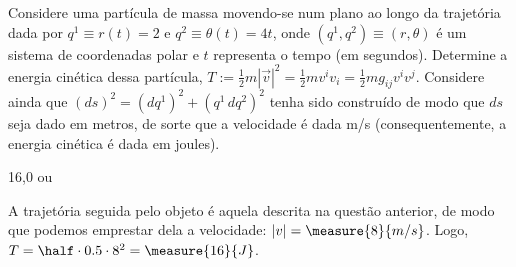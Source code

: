 \begin{question}
    Considere uma partícula de massa  movendo-se num plano ao longo da trajetória dada por $q^1 \equiv r(t) = 2$ e $q^2 \equiv \theta(t) = 4t$, onde $(q^1, q^2) \equiv (r,\theta)$ é um sistema de coordenadas polar e $t$ representa o tempo (em segundos).
    Determine a energia cinética dessa partícula, $T := \frac{1}{2} m |\vec v|^2 = \frac{1}{2} m v^i v_i = \frac{1}{2} m g_{ij} v^i v^j$.
    Considere ainda que $(ds)^2 = (dq^1)^2 + (q^1\, dq^2)^2$ tenha sido construído de modo que $ds$ seja dado em metros, de sorte que a velocidade é dada \unit{m/s} (consequentemente, a energia cinética é dada em joules).

    \begin{answer}
      16,0 ou 
    \end{answer}

    \begin{solution}
      A trajetória seguida pelo objeto é aquela descrita na questão anterior, de modo que podemos emprestar dela a velocidade: $|v| = \measure{8}{m/s}$. Logo, $T = \half \cdot 0.5 \cdot 8^2 = \measure{16}{J}$.
    \end{solution}
\end{question}